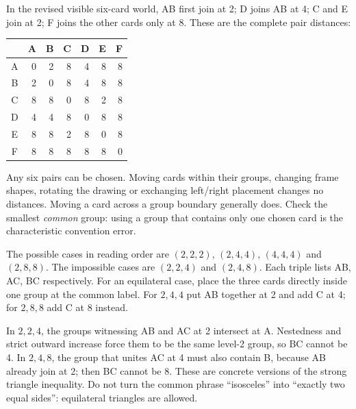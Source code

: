 \newpage
{}
In the revised visible six-card world, AB first join at 2; D joins AB at 4; C and E join at 2; F joins the other cards only at 8. These are the complete pair distances:
\begin{center}\renewcommand{\arraystretch}{1.2}
\begin{tabular}{c|rrrrrr}
&A&B&C&D&E&F\\\hline
A&0&2&8&4&8&8\\
B&2&0&8&4&8&8\\
C&8&8&0&8&2&8\\
D&4&4&8&0&8&8\\
E&8&8&2&8&0&8\\
F&8&8&8&8&8&0
\end{tabular}\end{center}
Any six pairs can be chosen. Moving cards within their groups, changing frame shapes, rotating the drawing or exchanging left/right placement changes no distances. Moving a card across a group boundary generally does. Check the smallest \emph{common} group: using a group that contains only one chosen card is the characteristic convention error.

The possible cases in reading order are $(2,2,2)$, $(2,4,4)$, $(4,4,4)$ and $(2,8,8)$. The impossible cases are $(2,2,4)$ and $(2,4,8)$. Each triple lists AB, AC, BC respectively. For an equilateral case, place the three cards directly inside one group at the common label. For $2,4,4$ put AB together at 2 and add C at 4; for $2,8,8$ add C at 8 instead.

In $2,2,4$, the groups witnessing AB and AC at 2 intersect at A. Nestedness and strict outward increase force them to be the same level-2 group, so BC cannot be 4. In $2,4,8$, the group that unites AC at 4 must also contain B, because AB already join at 2; then BC cannot be 8. These are concrete versions of the strong triangle inequality. Do not turn the common phrase ``isosceles'' into ``exactly two equal sides'': equilateral triangles are allowed.

